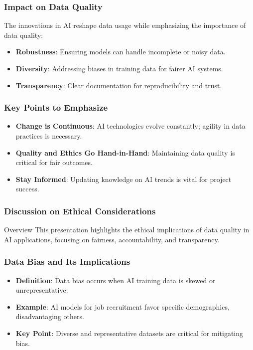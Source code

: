 \documentclass[aspectratio=169]{beamer}
\begin{document}
\begin{frame}[fragile]
    \frametitle{Impact on Data Quality}
    The innovations in AI reshape data usage while emphasizing the importance of data quality:
    \begin{itemize}
        \item \textbf{Robustness}: Ensuring models can handle incomplete or noisy data.
        \item \textbf{Diversity}: Addressing biases in training data for fairer AI systems.
        \item \textbf{Transparency}: Clear documentation for reproducibility and trust.
    \end{itemize}
\end{frame}

\begin{frame}[fragile]
    \frametitle{Key Points to Emphasize}
    \begin{itemize}
        \item \textbf{Change is Continuous}: AI technologies evolve constantly; agility in data practices is necessary.
        \item \textbf{Quality and Ethics Go Hand-in-Hand}: Maintaining data quality is critical for fair outcomes.
        \item \textbf{Stay Informed}: Updating knowledge on AI trends is vital for project success.
    \end{itemize}
\end{frame}

\begin{frame}[fragile]
    \frametitle{Discussion on Ethical Considerations}
    \begin{block}{Overview}
        This presentation highlights the ethical implications of data quality in AI applications, focusing on fairness, accountability, and transparency.
    \end{block}
\end{frame}

\begin{frame}[fragile]
    \frametitle{Data Bias and Its Implications}
    \begin{itemize}
        \item \textbf{Definition}: Data bias occurs when AI training data is skewed or unrepresentative.
        \item \textbf{Example}: AI models for job recruitment favor specific demographics, disadvantaging others.
        \item \textbf{Key Point}: Diverse and representative datasets are critical for mitigating bias.
    \end{itemize}
\end{frame}
\end{document}
